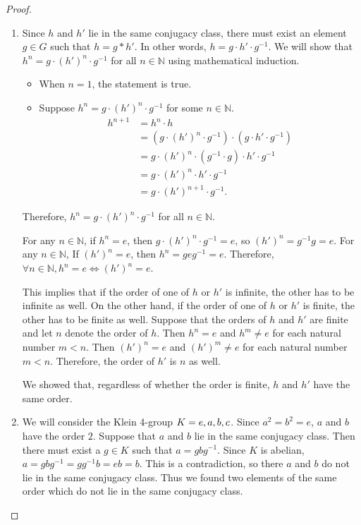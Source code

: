 \documentclass[12pt, psamsfonts]{amsart}
\theoremstyle{definition}
\theoremstyle{remark}
\numberwithin{equation}{section}
\begin{document}
\begin{proof}
  \begin{enumerate}
    \item
      Since $h$ and $h'$ lie in the same conjugacy class, there must exist an element $g \in G$ such that $h = g * h'$.
      In other words, $h = g \cdot h' \cdot g^{-1}$.
      We will show that $h^n = g \cdot (h')^n \cdot g^{-1}$ for all $n \in \mathbb{N}$ using mathematical induction.
      \begin{itemize}
        \item
          When $n = 1$, the statement is true.
        \item
          Suppose $h^n = g \cdot (h')^n \cdot g^{-1}$ for some $n \in \mathbb{N}$.
          \begin{align*}
            h^{n + 1}
              &= h^n \cdot h \\
              &= (g \cdot (h')^n \cdot g^{-1}) \cdot (g \cdot h' \cdot g^{-1}) \\
              &= g \cdot (h')^n \cdot (g^{-1} \cdot g) \cdot h' \cdot g^{-1} \\
              &= g \cdot (h')^n \cdot h' \cdot g^{-1} \\
              &= g \cdot (h')^{n + 1} \cdot g^{-1}.
          \end{align*}
      \end{itemize}
      Therefore, $h^n = g \cdot (h')^n \cdot g^{-1}$ for all $n \in \mathbb{N}$.

      For any $n \in \mathbb{N}$, if $h^n = e$, then $g \cdot (h')^n \cdot g^{-1} = e$, so $(h')^n = g^{-1}g = e$.
      For any $n \in \mathbb{N}$, If $(h')^n = e$, then $h^n = geg^{-1} = e$.
      Therefore, $\forall n \in \mathbb{N}, h^n = e \iff (h')^n = e$.

      This implies that if the order of one of $h$ or $h'$ is infinite, the other has to be infinite as well.
      On the other hand, if the order of one of $h$ or $h'$ is finite, the other has to be finite as well.
      Suppose that the orders of $h$ and $h'$ are finite and let $n$ denote the order of $h$.
      Then $h^n = e$ and $h^m \ne e$ for each natural number $m < n$.
      Then $(h')^n = e$ and $(h')^m \ne e$ for each natural number $m < n$.
      Therefore, the order of $h'$ is $n$ as well.

      We showed that, regardless of whether the order is finite, $h$ and $h'$ have the same order.
    \item
      We will consider the Klein 4-group $K = \\{ e, a, b, c \\}$.
      Since $a^2 = b^2 = e$, $a$ and $b$ have the order $2$.
      Suppose that $a$ and $b$ lie in the same conjugacy class.
      Then there must exist a $g \in K$ such that $a = gbg^{-1}$.
      Since $K$ is abelian, $a = gbg^{-1} = gg^{-1}b = eb = b$.
      This is a contradiction, so there $a$ and $b$ do not lie in the same conjugacy class.
      Thus we found two elements of the same order which do not lie in the same conjugacy class.
  \end{enumerate}
\end{proof}
\end{document}
